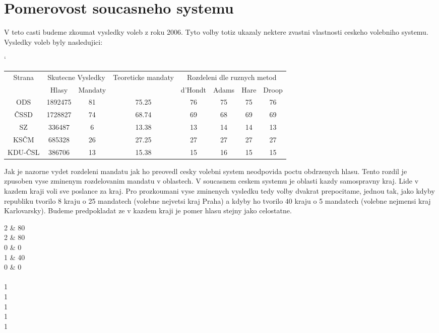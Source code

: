 \documentclass[12pt,a4paper]{article}
\begin{document}
\section{Pomerovost soucasneho systemu}
V teto casti budeme zkoumat vysledky voleb z roku 2006. 
Tyto volby totiz ukazaly nektere zvastni vlastnosti ceskeho volebniho systemu.
Vysledky voleb byly nasledujici:

\begin{center}
\catcode`
\begin{tabular}{|c|c|c|c|c|c|c|c|}
\hline
\multirow{2}{*}{Strana}  & \multicolumn{2}{|c|}{Skutecne Vysledky} & \multirow{2}{*}{Teoreticke mandaty} & \multicolumn{4}{|c|}{Rozdeleni dle ruznych metod} \\ \cline{2-3} \cline{5-8}
& Hlasy & Mandaty & & d'Hondt & Adams & Hare & Droop \\  
\hline
ODS & 1892475 & 81 & 75.25 & 76 & 75 & 75 & 76 \\ 
\hline
ČSSD & 1728827 & 74 & 68.74 & 69 & 68 & 69 & 69 \\ 
\hline
SZ & 336487 & 6 & 13.38 & 13 & 14 & 14 & 13 \\ 
\hline
KSČM & 685328 & 26 & 27.25 & 27 & 27 & 27 & 27 \\ 
\hline
KDU-ČSL & 386706 & 13 & 15.38 & 15 & 16 & 15 & 15 \\ 
\hline
\end{tabular} 
\end{center}
Jak je nazorne vydet rozdeleni mandatu jak ho preovedl cesky volebni system neodpovida poctu obdrzenych hlasu.
Tento rozdil je zpusoben vyse zminenym rozdelovanim mandatu v oblastech.
V soucasnem ceskem systemu je oblasti kazdy samospravny kraj.
Lide v kazdem kraji voli sve poslance za kraj.
Pro prozkoumani vyse zminenych vysledku tedy volby dvakrat prepocitame, jednou tak, jako kdyby republiku tvorilo 8 kraju o 25 mandatech (volebne nejvetsi kraj Praha) a kdyby ho tvorilo 40 kraju o 5 mandatech (volebne nejmensi kraj Karlovarsky).
Budeme predpokladat ze v kazdem kraji je pomer hlasu stejny jako celostatne.



2 \& 80\\
2 \& 80\\
0 \& 0\\
1 \& 40\\
0 \& 0\\
\\
1\\
1\\
1\\
1\\
1\\
\end{document}

